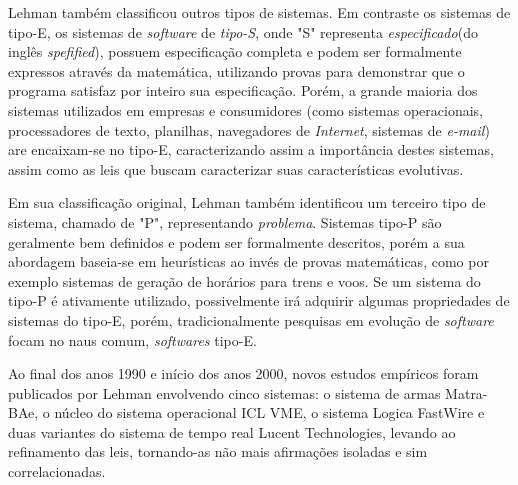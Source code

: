 Lehman também classificou outros tipos de sistemas. Em contraste os sistemas de tipo-E, os sistemas de \textit{software} de \textit{tipo-S}, onde "S" representa \textit{especificado}(do inglês \textit{spefified}), possuem especificação completa e podem ser formalmente expressos através da matemática, utilizando provas para demonstrar que o programa satisfaz por inteiro sua especificação. Porém, a grande maioria dos sistemas utilizados em empresas e consumidores (como sistemas operacionais, processadores de texto, planilhas, navegadores de \textit{Internet}, sistemas de \textit{e-mail}) are encaixam-se no tipo-E\cite{softwareEvolution2008}, caracterizando assim a importância destes sistemas, assim como as leis que buscam caracterizar suas características evolutivas. 

Em sua classificação original\cite{lehman1979understanding}, Lehman também identificou um terceiro tipo de sistema, chamado de "P", representando \textit{problema}. Sistemas tipo-P são geralmente bem definidos e podem ser formalmente descritos, porém a sua abordagem baseia-se em heurísticas ao invés de provas matemáticas, como por exemplo sistemas de geração de horários para trens e voos. Se um sistema do tipo-P é ativamente utilizado, possivelmente irá adquirir algumas propriedades de sistemas do tipo-E, porém, tradicionalmente pesquisas em evolução de \textit{software} focam no naus comum, \textit{softwares} tipo-E.

Ao final dos anos 1990 e início dos anos 2000, novos estudos empíricos foram publicados por Lehman\cite{lehman2002overview} envolvendo cinco sistemas: o sistema de armas Matra-BAe, o núcleo do sistema operacional ICL VME, o sistema Logica FastWire e duas variantes do sistema de tempo real Lucent Technologies, levando ao refinamento das leis, tornando-as não mais afirmações isoladas e sim correlacionadas.

